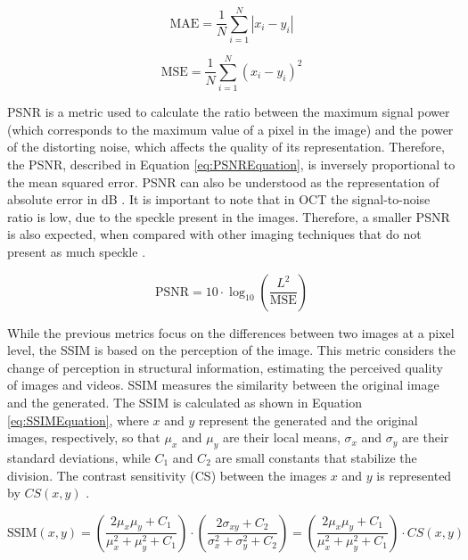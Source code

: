 \begin{equation}
	\text{MAE} = \frac{1}{N} \sum_{i=1}^{N} |x_i - y_i|
	\label{eq:MAEEquation}
\end{equation}

\begin{equation}
	\text{MSE} = \frac{1}{N} \sum_{i=1}^{N} \left( x_i - y_i \right)^{2}
	\label{eq:MSEEquation}
\end{equation}

PSNR is a metric used to calculate the ratio between the maximum signal power (which corresponds to the maximum value of a pixel in the image) and the power of the distorting noise, which affects the quality of its representation. Therefore, the PSNR, described in Equation \ref{eq:PSNREquation}, is inversely proportional to the mean squared error. PSNR can also be understood as the representation of absolute error in dB \parencite{Sara2019}. It is important to note that in OCT the signal-to-noise ratio is low, due to the speckle present in the images. Therefore, a smaller PSNR is also expected, when compared with other imaging techniques that do not present as much speckle \parencite{Bogunovic2019a}.

\begin{equation}
	\text{PSNR} = 10 \cdot \log_{10} \left( \frac{L^2}{\text{MSE}} \right)
	\label{eq:PSNREquation}
\end{equation}

While the previous metrics focus on the differences between two images at a pixel level, the SSIM is based on the perception of the image. This metric considers the change of perception in structural information, estimating the perceived quality of images and videos. SSIM measures the similarity between the original image and the generated. The SSIM is calculated as shown in Equation \ref{eq:SSIMEquation}, where $x$ and $y$ represent the generated and the original images, respectively, so that $\mu_{x}$ and $\mu_{y}$ are their local means, $\sigma_{x}$ and $\sigma_{y}$ are their standard deviations, while $C_{1}$ and $C_{2}$ are small constants that stabilize the division. The contrast sensitivity (CS) between the images $x$ and $y$ is represented by $CS(x,y)$ \parencite{Sara2019}.

\begin{equation}
	\text{SSIM}(x, y) = \left( \frac{2\mu_x \mu_y + C_1}{\mu_x^2 + \mu_y^2 + C_1} \right) \cdot \left( \frac{2\sigma_{xy} + C_2}{\sigma_x^2 + \sigma_y^2 + C_2} \right) = \left( \frac{2\mu_x \mu_y + C_1}{\mu_x^2 + \mu_y^2 + C_1} \right) \cdot CS(x, y)
	\label{eq:SSIMEquation} 
\end{equation}

